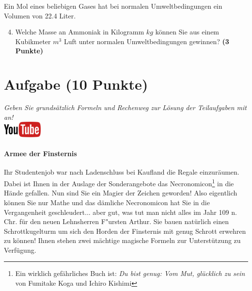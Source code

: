 \documentclass[a4paper, 10pt]{scrartcl}\usepackage[]{graphicx}\usepackage[]{xcolor}
\begin{document}
Ein Mol eines beliebigen Gases hat bei normalen Umweltbedingungen ein
Volumen von 22.4 Liter. %

\begin{enumerate}
  \setcounter{enumi}{3}
\item Welche Masse an Ammoniak in Kilogramm $kg$ k{\"o}nnen Sie aus einem
  Kubikmeter $m^3$ Luft unter normalen Umweltbedingungen gewinnen?
  \textbf{(3 Punkte)}
\end{enumerate}

 
\clearpage

\section{Aufgabe \hfill (10 Punkte)}

\textit{Geben Sie grunds{\"a}tzlich Formeln und Rechenweg zur L{\"o}sung der
  Teilaufgaben mit an!} \\[1Ex]

\hfill\href{https://youtu.be/Bbu6n8MXxQk}{\includegraphics[width =
  2cm]{img/youtube}} %
\hspace{2Ex}

\paragraph{Armee der Finsternis}



Ihr Studentenjob war nach Ladenschluss bei Kaufland die Regale
einzur{\"a}umen. Dabei ist Ihnen in der Auslage der Sonderangebote das
Necronomicon\footnote{Ein wirklich gef{\"a}hrliches Buch ist:
  \textit{Du bist genug: Vom Mut, gl{\"u}cklich zu sein} von Fumitake Koga und
  Ichiro Kishimi} in die H{\"a}nde gefallen. Nun sind Sie ein Magier der
Zeichen geworden! Also eigentlich k{\"o}nnen Sie nur Mathe und das d{\"a}mliche
Necronomicon hat Sie in die Vergangenheit geschleudert... aber gut, was tut
man nicht alles im Jahr 109 n. Chr. f{\"u}r den neuen Lehnsherren
F{"u}rsten Arthur. Sie bauen nat{\"u}rlich einen Schrottkugelturm um sich den
Horden der Finsternis mit genug Schrott erwehren zu k{\"o}nnen! Ihnen stehen
zwei m{\"a}chtige magische Formeln zur Unterst{\"u}tzung zu Verf{\"u}gung.
\end{document}
